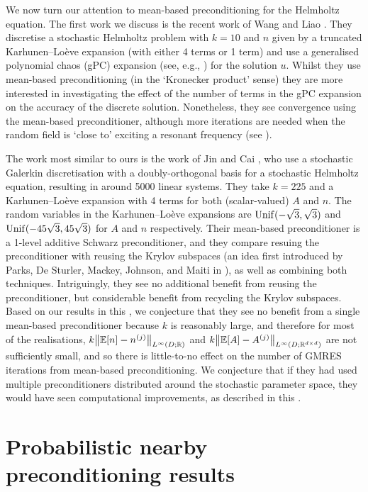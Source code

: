 We now turn our attention to mean-based preconditioning for the Helmholtz equation. The first work we discuss is the recent work of Wang and Liao \cite{WaLi:19}. They discretise a stochastic Helmholtz problem with $k=10$ and $n$ given by a truncated Karhunen--Lo\`eve expansion (with either 4 terms or 1 term) and use a generalised polynomial chaos (gPC) expansion (see, e.g., \cite{XiKa:02}) for the solution $u$. Whilst they use mean-based preconditioning (in the `Kronecker product' sense) they are more interested in investigating the effect of the number of terms in the gPC expansion on the accuracy of the discrete solution. Nonetheless, they see convergence using the mean-based preconditioner, although more iterations are needed when the random field is `close to' exciting a resonant frequency (see \cite[Example 4.2]{WaLi:19}).

The work most similar to ours is the work of Jin and Cai \cite{JiCa:09}, who use a stochastic Galerkin discretisation with a doubly-orthogonal basis for a stochastic Helmholtz equation, resulting in around 5000 linear systems. They take $k = 225$ and a Karhunen--Lo\`eve expansion with 4 terms for both (scalar-valued) $A$ and $n$. The random variables in the Karhunen--Lo\`eve expansions are $\mathrm{Unif}(-\sqrt{3},\sqrt{3})$ and $\mathrm{Unif}(-45\sqrt{3},45\sqrt{3})$ for $A$ and $n$ respectively. Their mean-based preconditioner is a 1-level additive Schwarz preconditioner, and they compare resuing the preconditioner with reusing the Krylov subspaces (an idea first introduced by Parks, De Sturler, Mackey, Johnson, and Maiti in \cite{PadeMaJoMa:06}), as well as combining both techniques. Intriguingly, they see no additional benefit from reusing the preconditioner, but considerable benefit from recycling the Krylov subspaces. Based on our results in this , we conjecture that they see no benefit from a single mean-based preconditioner because $k$ is reasonably large, and therefore for most of the realisations, $k\NLiDRR{\EXP{n}-\nsj}$ and $k\NLiDRRdtd{\EXP{A}-\Asj}$ are not sufficiently small, and so there is little-to-no effect on the number of GMRES iterations from mean-based preconditioning. We conjecture that if they had used multiple preconditioners distributed around the stochastic parameter space, they would have seen computational improvements, as described in this .
    
\section{Probabilistic nearby preconditioning results}\label{sec:nbpcstochastic}

